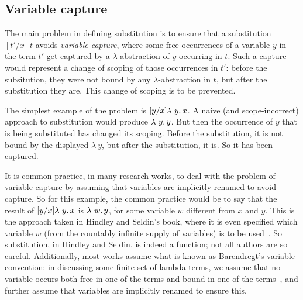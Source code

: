 \subsection{Variable capture}

 The main problem in defining substitution is to ensure that a
 substitution $[t'/x]t$ avoids \emph{variable capture}, where some
 free occurrences of a variable $y$ in the term $t'$ get captured by a
 $\lambda$-abstraction of $y$ occurring in $t$.  Such a capture would
 represent a change of scoping of those occurrences in $t'$: before
 the subsitution, they were not bound by any $\lambda$-abstraction in
 $t$, but after the substitution they are.  This change of scoping is
 to be prevented.

 The simplest example of the problem is $[y/x]\lambda\ y.\, x$.  A naive
 (and scope-incorrect) approach to substitution would produce $\lambda\ y.\, y$.
 But then the occurrence of $y$ that is being substituted has changed its scoping.  Before the
 substitution, it is not bound by the displayed $\lambda\ y$, but after the
 substitution, it is.  So it has been captured.

 It is common practice, in many research works, to deal with the
 problem of variable capture by assuming that variables are implicitly
 renamed to avoid capture.  So for this example, the common practice
 would be to say that the result of $[y/x]\lambda\ y.\, x$ is $\lambda\ w.\, y$,
 for some variable $w$ different from $x$ and $y$.  This is the
 approach taken in Hindley and Seldin's book, where it is even
 specified which variable $w$ (from the countably infinite supply of
 variables) is to be used~\cite{hindley+08}.  So substitution, in
 Hindley and Seldin, is indeed a function; not all authors are so
 careful.  Additionally, most works assume what is known as
 Barendregt's variable convention: in discussing some finite set of
 lambda terms, we assume that no variable occurs both free in one of
 the terms and bound in one of the terms~\cite[Definition
   2.1.13]{barendregt85}, and further assume that variables are
 implicitly renamed to ensure this.

